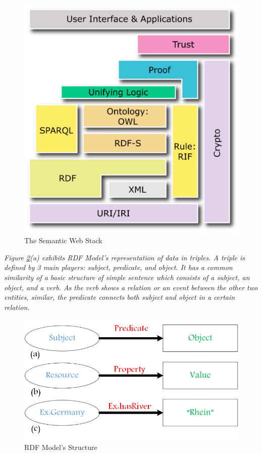 {{	\begin{figure}[ht]
	\begin{center}
		\includegraphics[scale=0.5,angle=0]{images/semanticWebStack}
		\caption{The Semantic Web Stack \cite{Bratt2007}}
		\label{Fig:semanticWebStack}
	\end{center}
\end{figure}
\vspace{12mm} %
\par
{\it Figure \ref{Fig:rdfModel}(a) exhibits RDF Model's representation of data in triples. A triple is defined by 3 main players: subject, predicate, and object. It has a common similarity of a basic structure of simple sentence which consists of a subject, an object, and a verb. As the verb shows a relation or an event between the other two entities, similar, the predicate connects both subject and object in a certain relation. 
	
\begin{figure}[ht]
	\begin{center}
		\includegraphics[scale=0.4,angle=0]{images/RDF-Model}
		\caption{RDF Model's Structure}
		\label{Fig:rdfModel}
	\end{center}
\end{figure}
 
}}}
